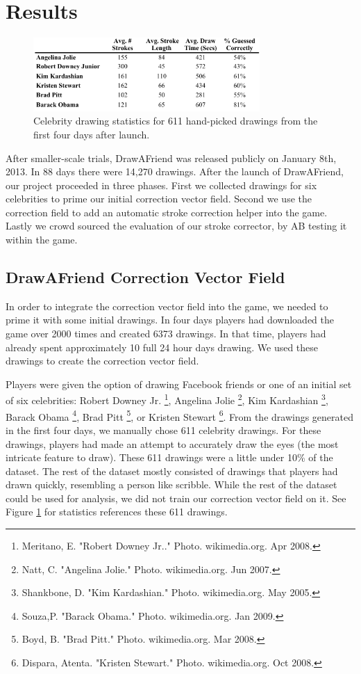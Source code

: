 \section{Results}
\begin{figure}
  \centering%
\includegraphics[height=1.1in]{./figures/daf-stats-cropped.pdf}
  \caption{Celebrity drawing statistics for 611 hand-picked drawings from the first four days after launch.}
  \label{fig:daf-stats}
\end{figure}



After smaller-scale trials, DrawAFriend was released publicly on January 8th, 2013. In 88 days there were 14,270 drawings. After the launch of DrawAFriend, our project proceeded in three phases. First we collected drawings for six celebrities to prime our initial correction vector field. Second we use the correction field to add an automatic stroke correction helper into the game. Lastly we crowd sourced the evaluation of our stroke corrector, by AB testing it within the game.

\subsection{DrawAFriend Correction Vector Field}
In order to integrate the correction vector field into the game, we needed to prime it with some initial drawings. In four days players had downloaded the game over 2000 times and created 6373 drawings. In that time, players had already spent approximately 10 full 24 hour days drawing. We used these drawings to create the correction vector field.


Players were given the option of drawing Facebook friends or one of an initial set of six celebrities: Robert Downey Jr. \footnote{Meritano, E. "Robert Downey Jr.." Photo. wikimedia.org. Apr 2008.}, Angelina Jolie \footnote{Natt, C. "Angelina Jolie." Photo. wikimedia.org. Jun 2007.}, Kim Kardashian \footnote{Shankbone, D. "Kim Kardashian." Photo. wikimedia.org. May 2005.}, Barack Obama \footnote{Souza,P. "Barack Obama." Photo. wikimedia.org. Jan 2009.}, Brad Pitt \footnote{Boyd, B. "Brad Pitt." Photo. wikimedia.org. Mar 2008.}, or Kristen Stewart \footnote{Dispara, Atenta. "Kristen Stewart." Photo. wikimedia.org. Oct 2008.}. From the drawings generated in the first four days, we manually chose 611 celebrity drawings. For these drawings, players had made an attempt to accurately draw the eyes (the most intricate feature to draw). These 611 drawings were a little under 10\% of the dataset. The rest of the dataset mostly consisted of drawings that players had drawn quickly, resembling a person like scribble. While the rest of the dataset could be used for analysis, we did not train our correction vector field on it.  See Figure \ref{fig:daf-stats}  for statistics references these 611 drawings.

